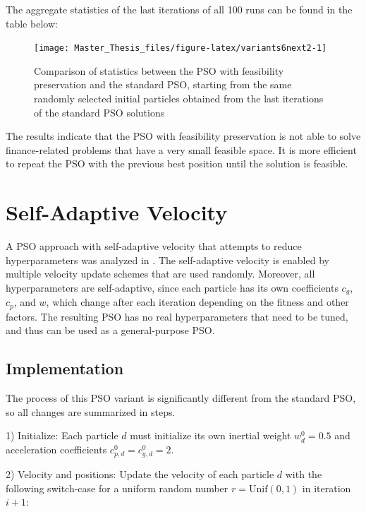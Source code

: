 \documentclass[
  oneside, a4paper, 12pt, openany]{book}
\theoremstyle{definition}
\theoremstyle{definition}
\theoremstyle{definition}
\theoremstyle{definition}
\theoremstyle{remark}
\begin{document}
The aggregate statistics of the last iterations of all 100 runs can be found in the table below:

\begin{figure}[H]
\texttt{[image: Master\_Thesis\_files/figure-latex/variants6next2-1]} \caption{Comparison of statistics between the PSO with feasibility preservation and the standard PSO, starting from the same randomly selected initial particles obtained from the last iterations of the standard PSO solutions}\label{fig:variants6next2}
\end{figure}

The results indicate that the PSO with feasibility preservation is not able to solve finance-related problems that have a very small feasible space. It is more efficient to repeat the PSO with the previous best position until the solution is feasible.

\hypertarget{self-adaptive-velocity}{%
\section{Self-Adaptive Velocity}\label{self-adaptive-velocity}}

A PSO approach with self-adaptive velocity that attempts to reduce hyperparameters was analyzed in \citep{FaYa2014}. The self-adaptive velocity is enabled by multiple velocity update schemes that are used randomly. Moreover, all hyperparameters are self-adaptive, since each particle has its own coefficients \(c_g\), \(c_p\), and \(w\), which change after each iteration depending on the fitness and other factors. The resulting PSO has no real hyperparameters that need to be tuned, and thus can be used as a general-purpose PSO.

\hypertarget{implementation-2}{%
\subsection{Implementation}\label{implementation-2}}

The process of this PSO variant is significantly different from the standard PSO, so all changes are summarized in steps.

1) Initialize: Each particle \(d\) must initialize its own inertial weight \(w_d^0=0.5\) and acceleration coefficients \(c_{p,d}^0 = c_{g,d}^0 = 2\).

2) Velocity and positions: Update the velocity of each particle \(d\) with the following switch-case for a uniform random number \(r = \text{Unif}(0,1)\) in iteration \(i+1\):
\end{document}
